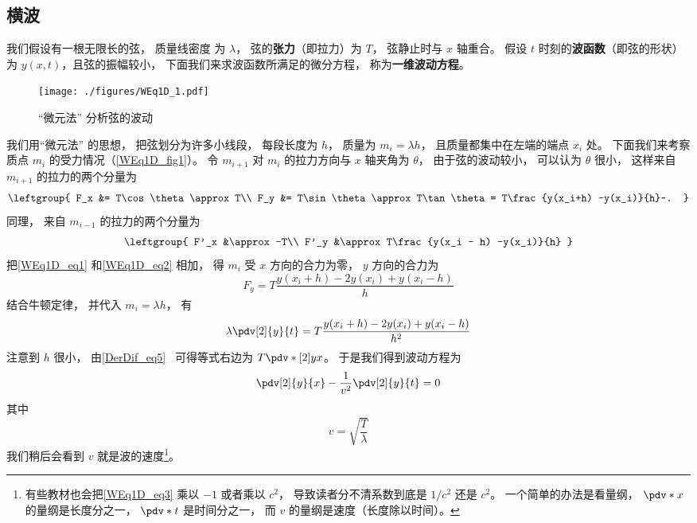 

\subsection{横波}
我们假设有一根无限长的弦， 质量线密度%
为 $\lambda$， 弦的\textbf{张力}（即拉力）为 $T$， 弦静止时与 $x$ 轴重合。 假设 $t$ 时刻的\textbf{波函数}（即弦的形状）为 $y(x, t)$，且弦的振幅较小， 下面我们来求波函数所满足的微分方程， 称为\textbf{一维波动方程}。

\begin{figure}[ht]
\centering
\texttt{[image: ./figures/WEq1D\_1.pdf]}
\caption{“微元法” 分析弦的波动} \label{WEq1D_fig1}
\end{figure}

我们用“微元法” 的思想， 把弦划分为许多小线段， 每段长度为 $h$， 质量为 $m_i = \lambda h$， 且质量都集中在左端的端点 $x_i$ 处。 下面我们来考察质点 $m_i$ 的受力情况（\autoref{WEq1D_fig1}）。 令 $m_{i+1}$ 对 $m_i$ 的拉力方向与 $x$ 轴夹角为 $\theta$， 由于弦的波动较小， 可以认为 $\theta$ 很小， 这样来自 $m_{i+1}$ 的拉力的两个分量为
\begin{equation}\label{WEq1D_eq1}
\leftgroup{
F_x &= T\cos\theta \approx T\\
F_y &= T\sin\theta \approx T\tan\theta = T\frac{y(x_i+h) -y(x_i)}{h}~.
}\end{equation}
同理， 来自 $m_{i-1}$ 的拉力的两个分量为
\begin{equation}\label{WEq1D_eq2}
\leftgroup{
F'_x &\approx -T\\
F'_y &\approx T\frac{y(x_i - h) -y(x_i)}{h}
}\end{equation}
把\autoref{WEq1D_eq1} 和\autoref{WEq1D_eq2} 相加， 得 $m_i$ 受 $x$ 方向的合力为零， $y$ 方向的合力为
\begin{equation}
F_y = T\frac{y(x_i+h) - 2y(x_i) + y(x_i-h)}{h}
\end{equation}
结合牛顿定律， 并代入 $m_i = \lambda h$， 有
\begin{equation}
\lambda \pdv[2]{y}{t} = T\frac{y(x_i+h) - 2y(x_i) + y(x_i-h)}{h^2}
\end{equation}
注意到 $h$ 很小， 由\autoref{DerDif_eq5}~ 可得等式右边为 $T\pdv*[2]{y}{x}$。 于是我们得到波动方程为
\begin{equation}\label{WEq1D_eq3}
\pdv[2]{y}{x} - \frac{1}{v^2}\pdv[2]{y}{t} = 0
\end{equation}
其中
\begin{equation}
v = \sqrt{\frac{T}{\lambda}}
\end{equation}
我们稍后会看到 $v$ 就是波的速度\footnote{有些教材也会把\autoref{WEq1D_eq3} 乘以 $-1$ 或者乘以 $c^2$， 导致读者分不清系数到底是 $1/c^2$ 还是 $c^2$。 一个简单的办法是看量纲， $\pdv*{x}$ 的量纲是长度分之一， $\pdv*{t}$ 是时间分之一， 而 $v$ 的量纲是速度（长度除以时间）。}。

